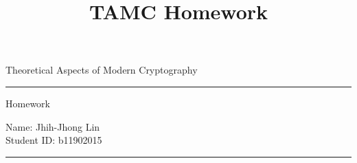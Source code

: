 \documentclass[a4paper,10pt]{article} %
\begin{document}

\title{TAMC Homework} %
\fancyhead[C]{}
\noindent\begin{minipage}{0.295\textwidth} %
\raggedright
Theoretical Aspects of Modern Cryptography\\ %
\footnotesize %

\medskip\hrule
\end{minipage}
\begin{minipage}{0.4\textwidth} %
\centering 
\large %
Homework \hwnumber\\ %
\normalsize %
\end{minipage}
\begin{minipage}{0.295\textwidth} %
\raggedleft

Name: Jhih-Jhong Lin\\
Student ID: b11902015
\footnotesize %

\medskip\hrule
\end{minipage}





\bigskip



\end{document}
